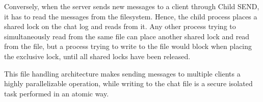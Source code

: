 Conversely, when the server sends new messages to a client through Child SEND, it has to read the messages from the filesystem. Hence, the child process places a shared lock on the chat log and reads from it. Any other process trying to simultaneously read from the same file can place another shared lock and read from the file, but a process trying to write to the file would block when placing the exclusive lock, until all shared locks have been released. 

This file handling architecture makes sending messages to multiple clients a highly parallelizable operation, while writing to the chat file is a secure isolated task performed in an atomic way.

%
%
%
